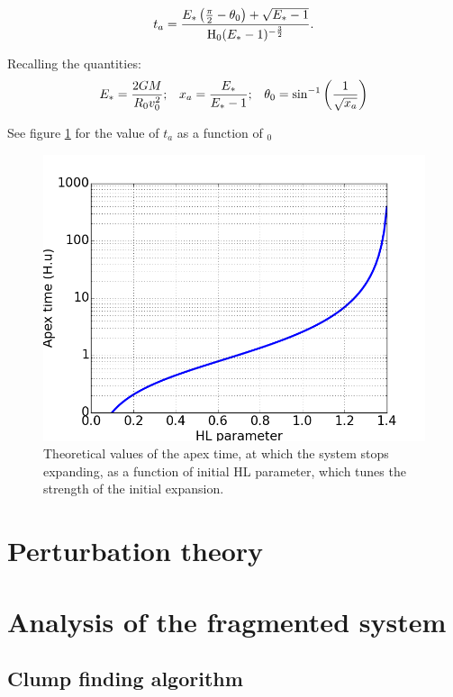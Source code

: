 \begin{equation}
t_a = \frac{E_\ast \left(\frac{\pi}{2} - \theta_0\right) + \sqrt{E_\ast-1}}{{\textrm{H}}_0 (E_\ast-1)^{-\frac{3}{2}}}.
\end{equation}

Recalling the quantities:
\begin{align}
E_\ast = \frac{2GM}{R_0 v_0^2}        &;  & x_a=\frac{E_\ast}{E_\ast-1}  &;  &\theta_0 = \sin^{-1}\left(\frac{1}{\sqrt{x_a}}\right)  
\end{align}

See figure \ref{Fig:apextime} for the value of $t_a$ as a function of \Hub$_0$

\begin{figure}
\center
\includegraphics[width=0.7\linewidth]{Figures/1_apextime.png}
\caption{Theoretical values of the apex time, at which the system stops expanding, as a function of initial HL parameter, which tunes the strength of the initial expansion.}
\label{Fig:apextime}
\end{figure} 





\section{Perturbation theory}


\section{Analysis of the fragmented system}

\subsection{Clump finding algorithm}




